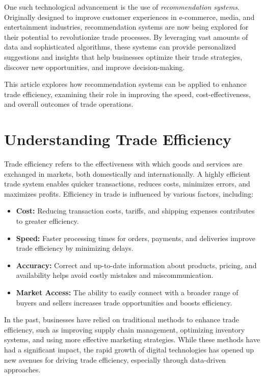 \documentclass[10pt,twoside,slovak,a4paper]{article}
\begin{document}
One such technological advancement is the use of \textit{recommendation systems}. Originally designed to improve customer experiences in e-commerce, media, and entertainment industries, recommendation systems are now being explored for their potential to revolutionize trade processes. By leveraging vast amounts of data and sophisticated algorithms, these systems can provide personalized suggestions and insights that help businesses optimize their trade strategies, discover new opportunities, and improve decision-making.

This article explores how recommendation systems can be applied to enhance trade efficiency, examining their role in improving the speed, cost-effectiveness, and overall outcomes of trade operations.



\section{Understanding Trade Efficiency}

Trade efficiency refers to the effectiveness with which goods and services are exchanged in markets, both domestically and internationally. A highly efficient trade system enables quicker transactions, reduces costs, minimizes errors, and maximizes profits. Efficiency in trade is influenced by various factors, including:

\begin{itemize}
    \item \textbf{Cost:} Reducing transaction costs, tariffs, and shipping expenses contributes to greater efficiency.
    \item \textbf{Speed:} Faster processing times for orders, payments, and deliveries improve trade efficiency by minimizing delays.
    \item \textbf{Accuracy:} Correct and up-to-date information about products, pricing, and availability helps avoid costly mistakes and miscommunication.
    \item \textbf{Market Access:} The ability to easily connect with a broader range of buyers and sellers increases trade opportunities and boosts efficiency.
\end{itemize}

\noindent In the past, businesses have relied on traditional methods to enhance trade efficiency, such as improving supply chain management, optimizing inventory systems, and using more effective marketing strategies. While these methods have had a significant impact, the rapid growth of digital technologies has opened up new avenues for driving trade efficiency, especially through data-driven approaches.
\end{document}
